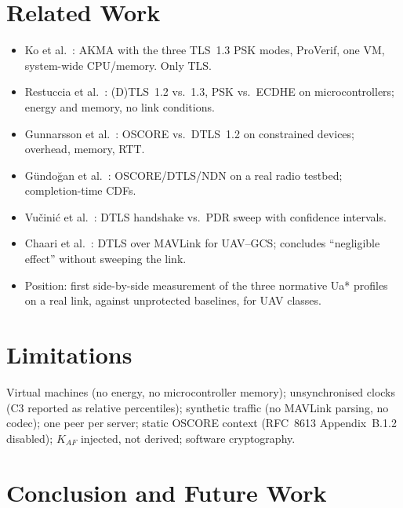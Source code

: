 \documentclass[conference]{IEEEtran}
\begin{document}


\section{Related Work}
\label{sec:related}

\begin{itemize}
  \item Ko et al.~\cite{ko2024}: AKMA with the three TLS~1.3 PSK modes,
        ProVerif, one VM, system-wide CPU/memory. Only TLS.
  \item Restuccia et al.~\cite{restuccia2020}: (D)TLS~1.2 vs.\ 1.3, PSK vs.\
        ECDHE on microcontrollers; energy and memory, no link conditions.
  \item Gunnarsson et al.~\cite{gunnarsson2021}: OSCORE vs.\ DTLS~1.2 on
        constrained devices; overhead, memory, RTT.
  \item G\"{u}ndo\u{g}an et al.~\cite{gundogan2020}: OSCORE/DTLS/NDN on a
        real radio testbed; completion-time CDFs.
  \item Vu\v{c}ini\'{c} et al.~\cite{vucinic2015}: DTLS handshake vs.\ PDR
        sweep with confidence intervals.
  \item Chaari et al.~\cite{chaari2020}: DTLS over MAVLink for UAV--GCS;
        concludes ``negligible effect'' without sweeping the link.
  \item Position: first side-by-side measurement of the three normative
        Ua* profiles on a real link, against unprotected baselines, for UAV
        classes.
\end{itemize}

\section{Limitations}
\label{sec:limits}
Virtual machines (no energy, no microcontroller memory); unsynchronised
clocks (C3 reported as relative percentiles); synthetic traffic (no MAVLink
parsing, no codec); one peer per server; static OSCORE context (RFC~8613
Appendix~B.1.2 disabled); $K_{AF}$ injected, not derived; software
cryptography.

\section{Conclusion and Future Work}
\label{sec:conclusion}
\end{document}
